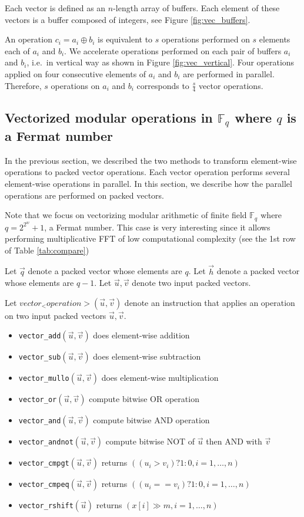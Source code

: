 \documentclass[oneside,9pt]{article}
\newcommand{\gf}[2][]{ \mathbb{F}_{{#2}^{#1}} }
\begin{document}
Each vector is defined as an $n$-length array of buffers. Each element of these vectors is a buffer composed of  integers, see Figure \ref{fig:vec_buffers}.

An operation $c_i = a_i \oplus b_i$ is equivalent to $s$ operations performed on $s$ elements each of $a_i$ and $b_i$. 
We accelerate operations performed on each pair of buffers $a_i$ and $b_i$,  i.e.\ in vertical way as shown in Figure \ref{fig:vec_vertical}. Four operations applied on four consecutive elements of $a_i$ and $b_i$ are performed in parallel. Therefore, $s$ operations on $a_i$ and $b_i$ corresponds to $\frac{s}{4}$ vector operations.

\subsection{Vectorized modular operations in $\gf{q}$ where $q$ is a Fermat number}

In the previous section, we described the two methods to transform element-wise operations to packed vector operations. Each vector operation performs several element-wise operations in parallel. In this section, we describe how the parallel operations are performed on packed vectors.

Note that we focus on vectorizing modular arithmetic of finite field $\gf{q}$ where $q=2^{2^w}+1$, a Fermat number.
This case is very interesting since it allows performing multiplicative FFT of low computational complexity (see the 1st row of Table \ref{tab:compare}) \cite{fnt_lacan}

Let $\vec{q}$ denote a packed vector whose elements are $q$.
Let $\vec{h}$ denote a packed vector whose elements are $q-1$.
Let $\vec{u}, \vec{v}$ denote two input packed vectors. 

Let $vector_<operation>(\vec{u}, \vec{v})$ denote an instruction that applies an operation on two input packed vectors $\vec{u}, \vec{v}$.

\begin{itemize}
\item \texttt{vector\_add}$(\vec{u}, \vec{v})$ does element-wise addition
\item \texttt{vector\_sub}$(\vec{u}, \vec{v})$ does element-wise subtraction
\item \texttt{vector\_mullo}$(\vec{u}, \vec{v})$ does element-wise multiplication
\item \texttt{vector\_or}$(\vec{u}, \vec{v})$ compute bitwise OR operation
\item \texttt{vector\_and}$(\vec{u}, \vec{v})$ compute bitwise AND operation
\item \texttt{vector\_andnot}$(\vec{u}, \vec{v})$ compute bitwise NOT of $\vec{u}$ then AND with $\vec{v}$
\item \texttt{vector\_cmpgt}$(\vec{u}, \vec{v})$ returns $((u_i > v_i) ? 1 : 0, i=1, \dots, n)$
\item \texttt{vector\_cmpeq}$(\vec{u}, \vec{v})$ returns $((u_i == v_i) ? 1 : 0, i=1, \dots, n)$
\item \texttt{vector\_rshift}$(\vec{u})$ returns $(x[i] \gg m, i=1, \dots, n)$
\end{itemize}
\end{document}
